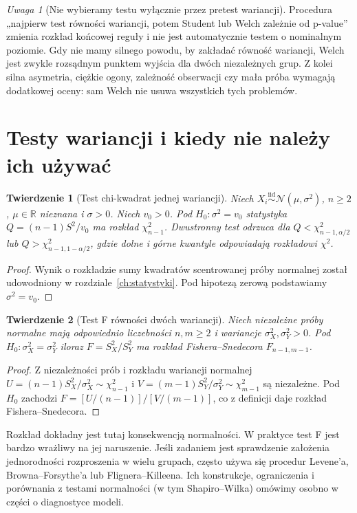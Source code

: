 \documentclass[11pt,a4paper,oneside]{report}
\numberwithin{equation}{chapter}
\theoremstyle{plain}
\newtheorem{twierdzenie}{Twierdzenie}[chapter]
\theoremstyle{definition}
\theoremstyle{remark}
\newtheorem{uwaga}{Uwaga}[chapter]
\newcommand{\R}{\mathbb R}
\newcommand{\Normal}{\mathcal N}
\newcommand{\iid}{\mathrel{\overset{\mathrm{iid}}\sim}}
\begin{document}
\begin{uwaga}[Nie wybieramy testu wyłącznie przez pretest wariancji]
Procedura „najpierw test równości wariancji, potem Student lub
Welch zależnie od p-value” zmienia rozkład końcowej reguły i
nie jest automatycznie testem o nominalnym poziomie.
Gdy nie mamy silnego powodu, by zakładać równość wariancji,
Welch jest zwykle rozsądnym punktem wyjścia dla dwóch
niezależnych grup. Z kolei silna asymetria, ciężkie ogony,
zależność obserwacji czy mała próba wymagają dodatkowej oceny:
sam Welch nie usuwa wszystkich tych problemów.
\end{uwaga}

\section{Testy wariancji i kiedy nie należy ich używać}
\begin{twierdzenie}[Test chi-kwadrat jednej wariancji]
Niech $X_i\iid\Normal(\mu,\sigma^2)$, $n\ge2$,
$\mu\in\R$ nieznana i $\sigma>0$. Niech $v_0>0$. Pod $H_0:\sigma^2=v_0$
statystyka $Q=(n-1)S^2/v_0$ ma rozkład
$\chi^2_{n-1}$. Dwustronny test odrzuca dla
$Q<\chi^2_{n-1,\alpha/2}$ lub
$Q>\chi^2_{n-1,1-\alpha/2}$, gdzie dolne i górne
kwantyle odpowiadają rozkładowi $\chi^2$.
\end{twierdzenie}
\begin{proof}
Wynik o rozkładzie sumy kwadratów scentrowanej próby
normalnej został udowodniony w rozdziale~\ref{ch:statystyki}.
Pod hipotezą zerową podstawiamy $\sigma^2=v_0$.
\end{proof}

\begin{twierdzenie}[Test F równości dwóch wariancji]
Niech niezależne próby normalne mają odpowiednio
liczebności $n,m\ge2$ i wariancje $\sigma_X^2,\sigma_Y^2>0$.
Pod $H_0:\sigma_X^2=\sigma_Y^2$ iloraz
$F=S_X^2/S_Y^2$ ma rozkład Fishera--Snedecora
$F_{n-1,m-1}$.
\end{twierdzenie}
\begin{proof}
Z niezależności prób i rozkładu wariancji normalnej
$U=(n-1)S_X^2/\sigma_X^2\sim\chi^2_{n-1}$ i
$V=(m-1)S_Y^2/\sigma_Y^2\sim\chi^2_{m-1}$ są
niezależne. Pod $H_0$ zachodzi
$F=[U/(n-1)]/[V/(m-1)]$, co z definicji daje
rozkład Fishera--Snedecora.
\end{proof}

Rozkład dokładny jest tutaj konsekwencją normalności.
W praktyce test F jest bardzo wrażliwy na jej naruszenie.
Jeśli zadaniem jest sprawdzenie założenia jednorodności
rozproszenia w wielu grupach, często używa się procedur
Levene'a, Browna--Forsythe'a lub Flignera--Killeena.
Ich konstrukcje, ograniczenia i porównania z testami
normalności (w tym Shapiro--Wilka) omówimy osobno w części
o diagnostyce modeli.
\end{document}
